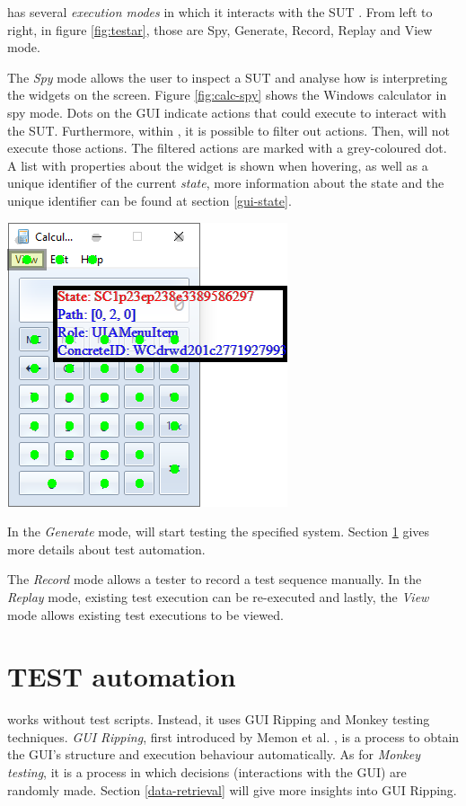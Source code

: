 \testar has several \emph{execution modes} in which it interacts with the SUT \cite{testar-manual}. From left to right, in figure \ref{fig:testar}, those are Spy, Generate, Record, Replay and View mode.

The \emph{Spy} mode allows the user to inspect a SUT and analyse how \testar is interpreting the widgets on the screen. Figure \ref{fig:calc-spy} shows the Windows calculator in spy mode. Dots on the GUI indicate actions that \testar could execute to interact with the SUT. Furthermore, within \testar, it is possible to filter out actions. Then, \testar will not execute those actions. The filtered actions are marked with a grey-coloured dot. A list with properties about the widget is shown when hovering, as well as a unique identifier of the current \emph{state}, more information about the state and the unique identifier can be found at section \ref{gui-state}.\par

\bigskip
\begingroup
\captionsetup{type=figure}
\includegraphics{images/calc-state.png}
\label{fig:calc-spy}
\endgroup

In the \emph{Generate} mode, \testar will start testing the specified system. Section \ref{testar-testauto} gives more details about \testar test automation.

The \emph{Record} mode allows a tester to record a test sequence manually. In the \emph{Replay} mode, existing test execution can be re-executed and lastly, the \emph{View} mode allows existing test executions to be viewed.

\section{TEST automation} \label{testar-testauto}
\testar works without test scripts. Instead, it uses GUI Ripping and Monkey testing techniques. \emph{GUI Ripping}, first introduced by Memon et al. \cite{gui-ripping}, is a process to obtain the GUI's structure and execution behaviour automatically. As for \emph{Monkey testing}, it is a process in which decisions (interactions with the GUI) are randomly made. Section \ref{data-retrieval} will give more insights into GUI Ripping.


